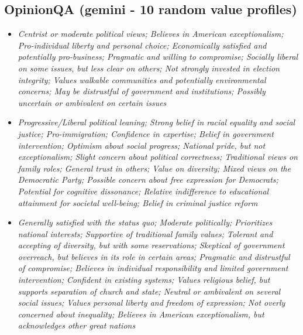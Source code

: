 \documentclass[11pt]{article}
\newcommand{\profiletext}[1]{\textit{#1}}
\begin{document}
\subsection{OpinionQA (gemini - 10 random value profiles)}
\begin{itemize}
\item \profiletext{Centrist or moderate political views; Believes in American exceptionalism; Pro-individual liberty and personal choice; Economically satisfied and potentially pro-business; Pragmatic and willing to compromise; Socially liberal on some issues, but less clear on others; Not strongly invested in election integrity; Values walkable communities and potentially environmental concerns; May be distrustful of government and institutions; Possibly uncertain or ambivalent on certain issues}
\item \profiletext{Progressive/Liberal political leaning; Strong belief in racial equality and social justice; Pro-immigration; Confidence in expertise; Belief in government intervention; Optimism about social progress; National pride, but not exceptionalism; Slight concern about political correctness; Traditional views on family roles; General trust in others; Value on diversity; Mixed views on the Democratic Party; Possible concern about free expression for Democrats; Potential for cognitive dissonance; Relative indifference to educational attainment for societal well-being; Belief in criminal justice reform}
\item \profiletext{Generally satisfied with the status quo; Moderate politically; Prioritizes national interests; Supportive of traditional family values; Tolerant and accepting of diversity, but with some reservations; Skeptical of government overreach, but believes in its role in certain areas; Pragmatic and distrustful of compromise; Believes in individual responsibility and limited government intervention; Confident in existing systems; Values religious belief, but supports separation of church and state; Neutral or ambivalent on several social issues; Values personal liberty and freedom of expression; Not overly concerned about inequality; Believes in American exceptionalism, but acknowledges other great nations}

\end{itemize}
\end{document}
